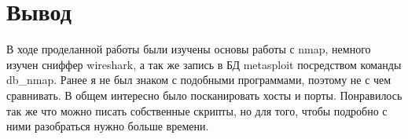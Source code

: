 \documentclass[11pt, a4paper]{article}		%
\begin{document}

\section{Вывод}

В ходе проделанной работы были изучены основы работы с nmap, немного изучен сниффер wireshark, а так же запись в БД metasploit посредством команды db\_nmap. Ранее я не был знаком с подобными программами, поэтому не с чем сравнивать. В общем интересно было посканировать хосты и порты. Понравилось так же что можно писать собственные скрипты, но для того, чтобы подробно с ними разобраться нужно больше времени. 
\end{document}
